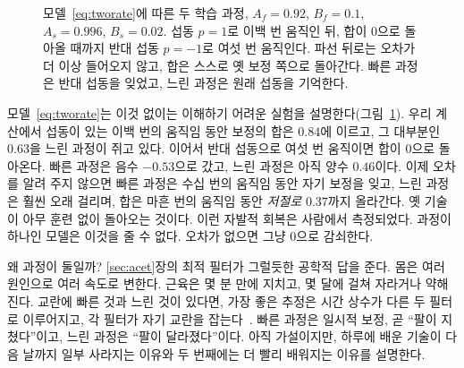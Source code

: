 \begin{figure}[t]
\centering
{}
\caption{모델~\eqref{eq:tworate}에 따른 두 학습 과정, $A_f=0.92$, $B_f=0.1$, $A_s=0.996$, $B_s=0.02$. 섭동 $p=1$로 이백 번 움직인 뒤, 합이 0으로 돌아올 때까지 반대 섭동 $p=-1$로 여섯 번 움직인다. 파선 뒤로는 오차가 더 이상 들어오지 않고, 합은 스스로 옛 보정 쪽으로 돌아간다. 빠른 과정은 반대 섭동을 잊었고, 느린 과정은 원래 섭동을 기억한다.}
\label{fig:tworate}
\end{figure}

모델~\eqref{eq:tworate}는 이것 없이는 이해하기 어려운 실험을 설명한다(그림~\ref{fig:tworate}). 우리 계산에서 섭동이 있는 이백 번의 움직임 동안 보정의 합은 $0.84$에 이르고, 그 대부분인 $0.63$을 느린 과정이 쥐고 있다. 이어서 반대 섭동으로 여섯 번 움직이면 합이 0으로 돌아온다. 빠른 과정은 음수 $-0.53$으로 갔고, 느린 과정은 아직 양수 $0.46$이다. 이제 오차를 알려 주지 않으면 빠른 과정은 수십 번의 움직임 동안 자기 보정을 잊고, 느린 과정은 훨씬 오래 걸리며, 합은 마흔 번의 움직임 동안 \emph{저절로} $0.37$까지 올라간다. 옛 기술이 아무 훈련 없이 돌아오는 것이다. 이런 자발적 회복은 사람에서 측정되었다. 과정이 하나인 모델은 이것을 줄 수 없다. 오차가 없으면 그냥 0으로 감쇠한다.

왜 과정이 둘일까? \ref{sec:acet}장의 최적 필터가 그럴듯한 공학적 답을 준다. 몸은 여러 원인으로 여러 속도로 변한다. 근육은 몇 분 만에 지치고, 몇 달에 걸쳐 자라거나 약해진다. 교란에 빠른 것과 느린 것이 있다면, 가장 좋은 추정은 시간 상수가 다른 두 필터로 이루어지고, 각 필터가 자기 교란을 잡는다~\cite{Kording2007}. 빠른 과정은 일시적 보정, 곧 “팔이 지쳤다”이고, 느린 과정은 “팔이 달라졌다”이다. 아직 가설이지만, 하루에 배운 기술이 다음 날까지 일부 사라지는 이유와 두 번째에는 더 빨리 배워지는 이유를 설명한다.


